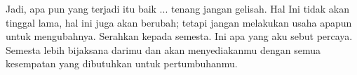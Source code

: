 Jadi, apa pun yang terjadi itu baik ... tenang jangan gelisah. Hal Ini tidak akan tinggal lama, hal ini juga akan berubah; tetapi jangan melakukan usaha apapun untuk mengubahnya. Serahkan kepada semesta. Ini apa yang aku sebut percaya. Semesta lebih bijaksana darimu dan akan menyediakanmu dengan semua kesempatan yang dibutuhkan untuk pertumbuhanmu.

